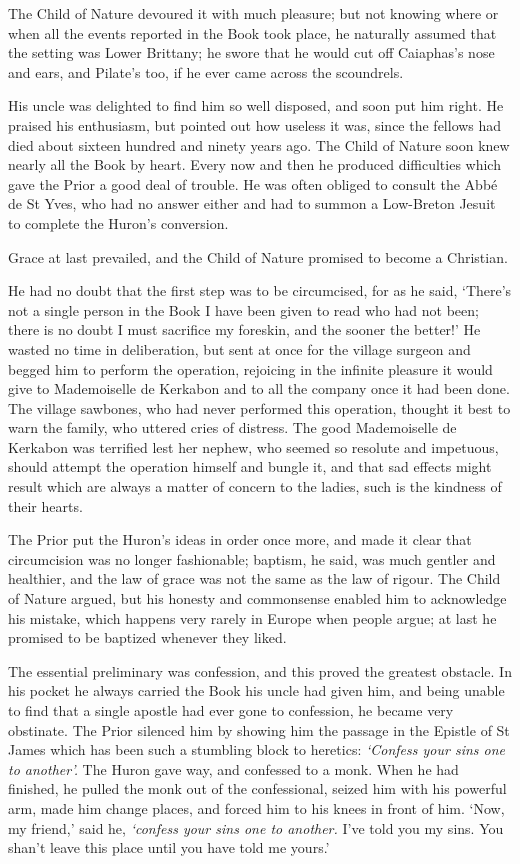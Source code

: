 \documentclass{article}
\begin{document}
\begin{center}
The Child of Nature devoured it with much pleasure; but not knowing where or when 
all the events reported in the Book took place, he naturally assumed that the setting 
was Lower Brittany; he swore that he would cut off Caiaphas's nose and ears, and 
Pilate's too, if he ever came across the scoundrels. 

His uncle was delighted to find him so well disposed, and soon put him right. He 
praised his enthusiasm, but pointed out how useless it was, since the fellows had 
died about sixteen hundred and ninety years ago. The Child of Nature soon knew 
nearly all the Book by heart. Every now and then he produced difficulties which 
gave the Prior a good deal of trouble. He was often obliged to consult the Abbé 
de St Yves, who had no answer either and had to summon a Low-Breton Jesuit to complete 
the Huron's conversion. 

Grace at last prevailed, and the Child of Nature promised to become a Christian. 

He had no doubt that the first step was to be circumcised, for as he said, `There's 
not a single person in the Book I have been given to read who had not been; there 
is no doubt I must sacrifice my foreskin, and the sooner the better!' He wasted 
no time in deliberation, but sent at once for the village surgeon and begged him 
to perform the operation, rejoicing in the infinite pleasure it would give to Mademoiselle 
de Kerkabon and to all the company once it had been done. The village sawbones, 
who had never performed this operation, thought it best to warn the family, who 
uttered cries of distress. The good Mademoiselle de Kerkabon was terrified lest 
her nephew, who seemed so resolute and impetuous, should attempt the operation 
himself and bungle it, and that sad effects might result which are always a matter 
of concern to the ladies, such is the kindness of their hearts. 

The Prior put the Huron's ideas in order once more, and made it clear that circumcision 
was no longer fashionable; baptism, he said, was much gentler and healthier, and 
the law of grace was not the same as the law of rigour. The Child of Nature argued, 
but his honesty and commonsense enabled him to acknowledge his mistake, which happens 
very rarely in Europe when people argue; at last he promised to be baptized whenever 
they liked. 

The essential preliminary was confession, and this proved the greatest obstacle. 
In his pocket he always carried the Book his uncle had given him, and being unable 
to find that a single apostle had ever gone to confession, he became very obstinate. 
The Prior silenced him by showing him the passage in the Epistle of St James which 
has been such a stumbling block to heretics: \textit{`Confess your sins one to 
another'.} The Huron gave way, and confessed to a monk. When he had finished, he 
pulled the monk out of the confessional, seized him with his powerful arm, made 
him change places, and forced him to his knees in front of him. `Now, my friend,' 
said he, \textit{`confess your sins one to another.} I've told you my sins. You 
shan't leave this place until you have told me yours.' 


\end{center}
\end{document}
